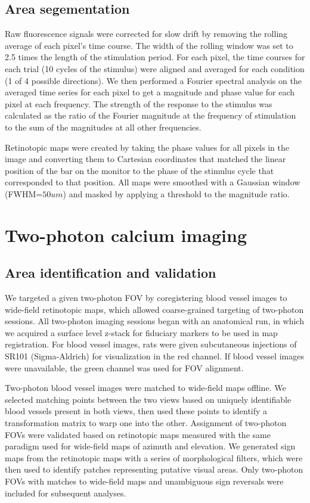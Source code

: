 \subsection{Area segementation}
Raw fluorescence signals were corrected for slow drift by removing the rolling average of each pixel’s time course. The width of the rolling window was set to 2.5 times the length of the stimulation period. For each pixel, the time courses for each trial (10 cycles of the stimulus) were aligned and averaged for each condition (1 of 4 possible directions). We then performed a Fourier spectral analysis on the averaged time series for each pixel to get a magnitude and phase value for each pixel at each frequency. The strength of the response to the stimulus was calculated as the ratio of the Fourier magnitude at the frequency of stimulation to the sum of the magnitudes at all other frequencies\cite{Kalatsky2003, Marshel2011, Juavinet2017}.

Retinotopic maps were created by taking the phase values for all pixels in the image and converting them to Cartesian coordinates that matched the linear position of the bar on the monitor to the phase of the stimulus cycle that corresponded to that position. All maps were smoothed with a Gaussian window (FWHM=$50um$) and masked by applying a threshold to the magnitude ratio.  

\section{Two-photon calcium imaging}
\subsection{Area identification and validation}
We targeted a given two-photon FOV by coregistering blood vessel images to wide-field retinotopic maps, which allowed coarse-grained targeting of two-photon sessions. All two-photon imaging sessions began with an anatomical run, in which we acquired a surface level z-stack for fiduciary markers to be used in map registration. For blood vessel images, rats were given subcutaneous injections of SR101 (Sigma-Aldrich) for visualization in the red channel. If blood vessel images were unavailable, the green channel was used for FOV alignment. 

Two-photon blood vessel images were matched to wide-field maps offline. We selected matching points between the two views based on uniquely identifiable blood vessels present in both views, then used these points to identify a transformation matrix to warp one into the other. Assignment of two-photon FOVs were validated based on retinotopic maps measured with the same paradigm used for wide-field maps of azimuth and elevation. We generated sign maps from the retinotopic maps with a series of morphological filters\cite{Marshel2011, Garrett2014, Zhuang2017}, which were then used to identify patches representing putative visual areas. Only two-photon FOVs with matches to wide-field maps and unambiguous sign reversals were included for subsequent analyses. 

